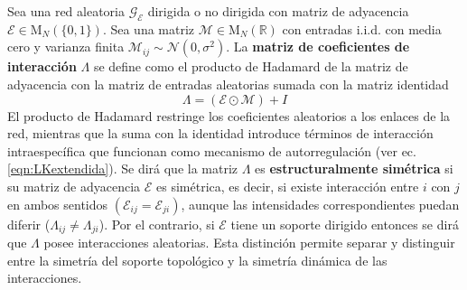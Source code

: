 \begin{definición}\label{def:MatrizIncidencias}
	Sea una red aleatoria $\mathcal{G}_\mathcal{E}$ dirigida o no dirigida con matriz de adyacencia $\mathcal{E}\in\mathrm{M}_N(\{0,1\})$. Sea una matriz $\mathcal{M}\in\mathrm{M}_N(\mathbb{R})$ con entradas i.i.d. con media cero y varianza finita $\mathcal{M}_{ij}\sim\mathcal{N}(0,\sigma^2)$. La \textbf{matriz de coeficientes de interacción} $\Lambda$ se define como el producto de Hadamard \cite{HadamardProduct} de la matriz de adyacencia con la matriz de entradas aleatorias sumada con la matriz identidad
	\begin{equation}\label{eqn:MatrizIncidencias}
		\Lambda=(\mathcal{E}\odot \mathcal{M}) + I
	\end{equation}
	El producto de Hadamard restringe los coeficientes aleatorios a los enlaces de la red, mientras que la suma con la identidad introduce términos de interacción intraespecífica que funcionan como mecanismo de autorregulación (ver ec. \eqref{eqn:LKextendida}). Se dirá que la matriz $\Lambda$ es \textbf{estructuralmente simétrica} si su matriz de adyacencia $\mathcal{E}$ es simétrica, es decir, si existe interacción entre $i$ con $j$ en ambos sentidos $(\mathcal{E}_{ij}=\mathcal{E}_{ji})$, aunque las intensidades correspondientes puedan diferir ($\Lambda_{ij}\neq\Lambda_{ji}$). Por el contrario, si $\mathcal{E}$ tiene un soporte dirigido entonces se dirá que $\Lambda$ posee interacciones aleatorias. Esta distinción permite separar y distinguir entre la simetría del soporte topológico y la simetría dinámica de las interacciones. 
	\newline
\end{definición}

